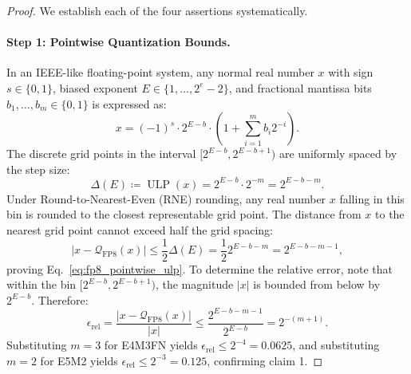 \begin{proof}
We establish each of the four assertions systematically.

\paragraph{Step 1: Pointwise Quantization Bounds.}
In an IEEE-like floating-point system, any normal real number $x$ with sign $s \in \{0, 1\}$, biased exponent $E \in \{1, \dots, 2^e - 2\}$, and fractional mantissa bits $b_1, \dots, b_m \in \{0, 1\}$ is expressed as:
\begin{equation}
x = (-1)^s \cdot 2^{E - b} \cdot \left( 1 + \sum_{i=1}^m b_i 2^{-i} \right).
\end{equation}
The discrete grid points in the interval $[2^{E - b}, 2^{E - b + 1})$ are uniformly spaced by the step size:
\begin{equation}
\Delta(E) \coloneqq \operatorname{ULP}(x) = 2^{E - b} \cdot 2^{-m} = 2^{E - b - m}.
\end{equation}
Under Round-to-Nearest-Even (RNE) rounding, any real number $x$ falling in this bin is rounded to the closest representable grid point. The distance from $x$ to the nearest grid point cannot exceed half the grid spacing:
\begin{equation}
|x - \mathcal{Q}_{\text{FP8}}(x)| \le \frac{1}{2} \Delta(E) = \frac{1}{2} 2^{E - b - m} = 2^{E - b - m - 1},
\end{equation}
proving Eq.~\eqref{eq:fp8_pointwise_ulp}.
To determine the relative error, note that within the bin $[2^{E - b}, 2^{E - b + 1})$, the magnitude $|x|$ is bounded from below by $2^{E - b}$. Therefore:
\begin{equation}
\epsilon_{\text{rel}} = \frac{|x - \mathcal{Q}_{\text{FP8}}(x)|}{|x|} \le \frac{2^{E - b - m - 1}}{2^{E - b}} = 2^{-(m + 1)}.
\end{equation}
Substituting $m=3$ for E4M3FN yields $\epsilon_{\text{rel}} \le 2^{-4} = 0.0625$, and substituting $m=2$ for E5M2 yields $\epsilon_{\text{rel}} \le 2^{-3} = 0.125$, confirming claim 1.


\end{proof}
